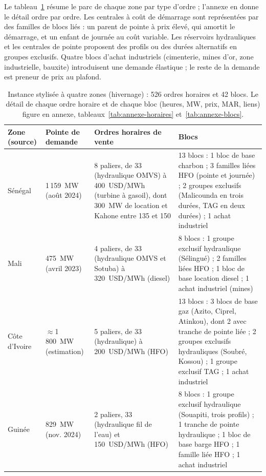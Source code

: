 \documentclass[a4paper,12pt]{article}
\newcommand{\rowsep}{\addlinespace[2pt]\arrayrulecolor{black!35}\hline\arrayrulecolor{black}\addlinespace[3pt]}
\renewcommand{\arraystretch}{1.25}
\theoremstyle{definition}
\begin{document}
Le tableau~\ref{tab:instance} résume le parc de chaque zone par type d'ordre ; l'annexe en donne le détail ordre par ordre. Les centrales à coût de démarrage sont représentées par des familles de blocs liés : un parent de pointe à prix élevé, qui amortit le démarrage, et un enfant de journée au coût variable. Les réservoirs hydrauliques et les centrales de pointe proposent des profils ou des durées alternatifs en groupes exclusifs. Quatre blocs d'achat industriels (cimenterie, mines d'or, zone industrielle, bauxite) introduisent une demande élastique ; le reste de la demande est preneur de prix au plafond.

\begin{table}[htbp]
\centering\small
\setlength{\tabcolsep}{6pt}
\renewcommand{\arraystretch}{1.3}
\begin{tabular}{p{2.3cm}p{2.1cm}p{4.6cm}p{5.6cm}}
\toprule
Zone (source) & Pointe de demande & Ordres horaires de vente & Blocs \\
\midrule
Sénégal \citep{senelec2024} & 1\,159~MW (août 2024) & 8 paliers, de 33 (hydraulique OMVS) à 400~USD/MWh (turbine à gasoil), dont 300~MW de location et Kahone entre 135 et 150 & 13 blocs : 1 bloc de base charbon ; 3 familles liées HFO (pointe et journée) ; 2 groupes exclusifs (Malicounda en trois durées, TAG en deux durées) ; 1 achat industriel \\ \rowsep
Mali \citep{edm2023} & 475~MW (avril 2023) & 4 paliers, de 33 (hydraulique OMVS et Sotuba) à 320~USD/MWh (diesel) & 8 blocs : 1 groupe exclusif hydraulique (Sélingué) ; 2 familles liées HFO ; 1 bloc de base location diesel ; 1 achat industriel (mines) \\ \rowsep
Côte d'Ivoire \citep{cienergies2024} & $\approx$1\,800~MW (estimation) & 5 paliers, de 33 (hydraulique) à 200~USD/MWh (HFO) & 13 blocs : 3 blocs de base gaz (Azito, Ciprel, Atinkou), dont 2 avec tranche de pointe liée ; 2 groupes exclusifs hydrauliques (Soubré, Kossou) ; 1 groupe exclusif TAG ; 1 achat industriel \\ \rowsep
Guinée \citep{edg2024} & 829~MW (nov. 2024) & 2 paliers, 33 (hydraulique fil de l'eau) et 150~USD/MWh (HFO) & 8 blocs : 1 groupe exclusif hydraulique (Souapiti, trois profils) ; 1 tranche de pointe hydraulique ; 1 bloc de base barge HFO ; 1 famille liée HFO ; 1 achat industriel \\
\bottomrule
\end{tabular}
\caption{Instance stylisée à quatre zones (hivernage) : 526 ordres horaires et 42 blocs. Le détail de chaque ordre horaire et de chaque bloc (heures, MW, prix, MAR, liens) figure en annexe, tableaux~\ref{tab:annexe-horaires} et~\ref{tab:annexe-blocs}.}
\label{tab:instance}
\end{table}
\end{document}
